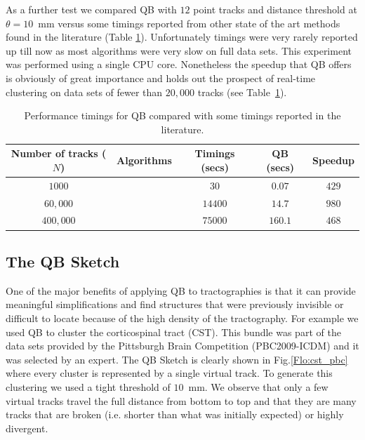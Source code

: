 \documentclass[journal]{IEEEtran}
\begin{document}
As a further test we compared QB with $12$ point tracks and distance
threshold at $\theta=10$~mm versus some timings reported from other
state of the art methods found in the literature (Table
\ref{Flo:timings}). Unfortunately timings were very rarely reported up
till now as most algorithms were very slow on full data sets. This
experiment was performed using a single CPU core. Nonetheless the
speedup that QB offers is obviously of great importance and holds out
the prospect of real-time clustering on data sets of fewer than $20,000$
tracks (see Table~\ref{Flo:timings}).

%
\begin{table}
\scriptsize\addtolength{\tabcolsep}{-5pt}
\caption{Performance timings for QB compared with some timings
  reported in the literature.\label{Flo:timings}}
\begin{centering}
\begin{tabular}{ccccc}
\hline 
\hline
Number of tracks ($N$) & Algorithms & Timings (secs) & QB (secs) & Speedup\tabularnewline
\hline
$1000$ & \cite{wang2010tractography} & $30$ & $0.07$ & $429$\tabularnewline
$60,000$ & \cite{wang2010tractography} & $14400$ & $14.7$ & $980$\tabularnewline
$400,000$ & \cite{Visser2010} & $75000$ & $160.1$ & $468$\tabularnewline
\hline
\end{tabular}
\par\end{centering}
\end{table}

\subsection{The QB Sketch}

One of the major benefits of applying QB to tractographies is that it
can provide meaningful simplifications and find structures that were
previously invisible or difficult to locate because of the high density
of the tractography. For example we used QB to cluster the corticospinal
tract (CST). This bundle was part of the data sets provided by the
Pittsburgh Brain Competition (PBC2009-ICDM) and it was selected by an
expert. The QB Sketch is clearly shown in Fig.\ref{Flo:cst_pbc} where
every cluster is represented by a single virtual track. To generate this
clustering we used a tight threshold of $10$~mm. We observe that only a
few virtual tracks travel the full distance from bottom to top and that
they are many tracks that are broken (i.e. shorter than what was
initially expected) or highly divergent.
\end{document}
